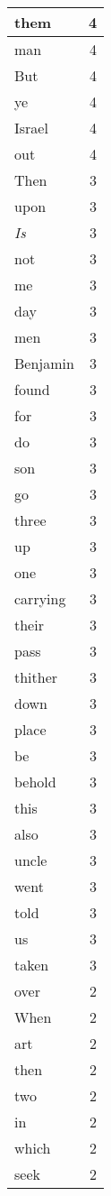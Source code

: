 \begin{center}
\begin{longtable}{l|r}
them & 4 \\ \hline
man & 4 \\ \hline
But & 4 \\ \hline
ye & 4 \\ \hline
Israel & 4 \\ \hline
out & 4 \\ \hline
Then & 3 \\ \hline
upon & 3 \\ \hline
\emph{Is} & 3 \\ \hline
not & 3 \\ \hline
me & 3 \\ \hline
day & 3 \\ \hline
men & 3 \\ \hline
Benjamin & 3 \\ \hline
found & 3 \\ \hline
for & 3 \\ \hline
do & 3 \\ \hline
son & 3 \\ \hline
go & 3 \\ \hline
three & 3 \\ \hline
up & 3 \\ \hline
one & 3 \\ \hline
carrying & 3 \\ \hline
their & 3 \\ \hline
pass & 3 \\ \hline
thither & 3 \\ \hline
down & 3 \\ \hline
place & 3 \\ \hline
be & 3 \\ \hline
behold & 3 \\ \hline
this & 3 \\ \hline
also & 3 \\ \hline
uncle & 3 \\ \hline
went & 3 \\ \hline
told & 3 \\ \hline
us & 3 \\ \hline
taken & 3 \\ \hline
over & 2 \\ \hline
When & 2 \\ \hline
art & 2 \\ \hline
then & 2 \\ \hline
two & 2 \\ \hline
in & 2 \\ \hline
which & 2 \\ \hline
seek & 2 \\ \hline

\end{longtable}
\end{center}
